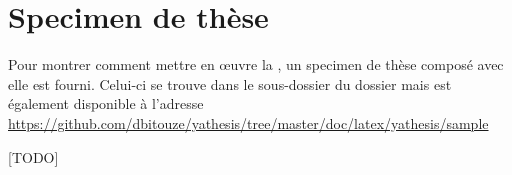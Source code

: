 \chapter{Specimen de thèse}\label{cha:specimen}

Pour montrer comment mettre en œuvre la \yatcl, un specimen de thèse composé
avec elle est fourni. Celui-ci se trouve dans le sous-dossier
 du dossier  mais est également
disponible à l'adresse
\url{https://github.com/dbitouze/yathesis/tree/master/doc/latex/yathesis/sample}


[TODO]

%
\iffalse
\fi
